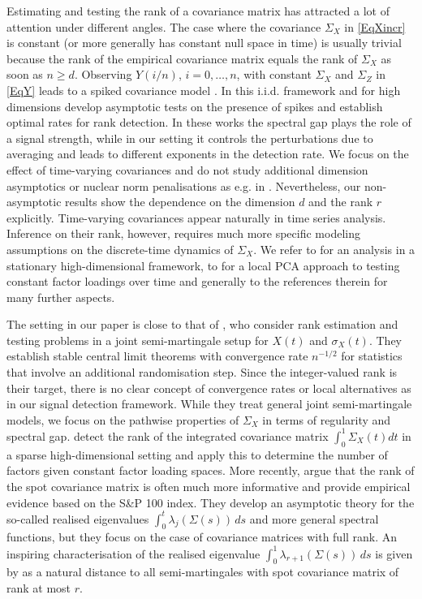\documentclass[preprint,aos]{imsart}
\numberwithin{equation}{section}
\theoremstyle{remark}
\renewcommand{\ge}{\geqslant}
\begin{document}
Estimating and testing the rank of a covariance matrix has attracted a lot of attention under different angles. The case where the covariance $\Sigma_X$ in \eqref{EqXincr} is constant (or more generally has constant null space in time) is usually trivial because the rank of the empirical covariance matrix  equals the rank of $\Sigma_X$ as soon as $n\ge d$. Observing $Y(i/n)$, $i=0,\ldots,n$, with constant $\Sigma_X$ and $\Sigma_Z$ in \eqref{EqY} leads to a spiked covariance model \citep{johnstone2001}. In this i.i.d. framework and for high dimensions \cite{onatski2014} develop asymptotic tests on the presence of spikes  and \citet{cai2015} establish optimal rates for rank detection. In these works the spectral gap plays the role of a signal strength, while in our setting it controls the perturbations due to averaging  and leads to different exponents in the detection rate. We focus on the effect of time-varying covariances and do not study additional dimension asymptotics or nuclear norm penalisations as e.g. in \cite{christensen2021}. Nevertheless, our non-asymptotic results show the dependence on the dimension $d$ and the rank $r$  explicitly. Time-varying covariances appear naturally in time series analysis.  Inference on their rank, however, requires much more specific modeling assumptions on the discrete-time dynamics of $\Sigma_X$. We refer to \citet{LamYao2012} for an analysis in a stationary high-dimensional framework, to \citet{Su2017} for a local PCA approach to testing constant factor loadings over time and generally to the references therein for many further aspects.

The setting in our paper is close to that of \citet{jacod2013}, who consider  rank estimation and testing problems in a joint semi-martingale setup for $X(t)$ and $\sigma_X(t)$. They establish stable central limit theorems with convergence rate $n^{-1/2}$ for statistics that involve an additional randomisation step. Since the integer-valued rank is their target, there is no clear concept of convergence rates or local alternatives as in our signal detection framework. While they treat general joint semi-martingale models, we focus on the pathwise properties of $\Sigma_X$ in terms of regularity and spectral gap.   \citet{ait2017} detect the rank of the integrated covariance matrix $\int_0^1\Sigma_X(t)dt$ in a sparse high-dimensional setting and apply this to determine the number of factors given constant factor loading spaces. More recently, \citet{ait2019}  argue that the rank of the spot covariance matrix is often much more informative and provide empirical evidence based on the S\&P 100 index. They develop an asymptotic theory for the so-called realised eigenvalues $\int_0^t\lambda_j(\Sigma(s))\,ds$ and more general spectral functions, but they focus on the case of  covariance matrices with full rank. An inspiring  characterisation of the realised eigenvalue $\int_0^1\lambda_{r+1}(\Sigma(s))\,ds$ is given by \citet{jacod2008} as a natural distance to all semi-martingales with spot covariance matrix of rank at most $r$.
\end{document}
